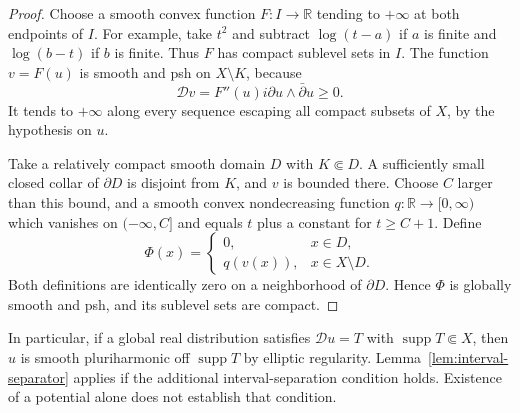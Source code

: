 \documentclass[11pt]{article}
\theoremstyle{remark}
\newcommand{\D}{\mathcal D}
\newcommand{\supp}{\operatorname{supp}}
\begin{document}
\begin{proof}
Choose a smooth convex function $F:I\to\mathbb R$ tending to $+\infty$
at both endpoints of $I$. For example, take $t^2$ and subtract
$\log(t-a)$ if $a$ is finite and $\log(b-t)$ if $b$ is finite.
Thus $F$ has compact sublevel sets in $I$. The function $v=F(u)$
is smooth and psh on $X\setminus K$, because
\[
 \D v=F''(u)i\partial u\wedge\bar\partial u\geq0.
\]
It tends to $+\infty$ along every sequence escaping all compact
subsets of $X$, by the hypothesis on $u$.

Take a relatively compact smooth domain $D$ with $K\Subset D$.
A sufficiently small closed collar of $\partial D$ is disjoint from
$K$, and $v$ is bounded there. Choose $C$ larger than this bound,
and a smooth convex nondecreasing function $q:\mathbb R\to[0,\infty)$
which vanishes on $(-\infty,C]$ and equals $t$ plus a constant for
$t\geq C+1$. Define
\[
 \Phi(x)=
 \begin{cases}
  0,&x\in D,\\
  q(v(x)),&x\in X\setminus D.
 \end{cases}
\]
Both definitions are identically zero on a neighborhood of
$\partial D$. Hence $\Phi$ is globally smooth and psh, and its
sublevel sets are compact.
\end{proof}

In particular, if a global real distribution satisfies $\D u=T$
with $\supp T\Subset X$, then $u$ is smooth pluriharmonic off
$\supp T$ by elliptic regularity. Lemma~\ref{lem:interval-separator}
applies if the additional interval-separation condition holds.
Existence of a potential alone does not establish that condition.
\end{document}
